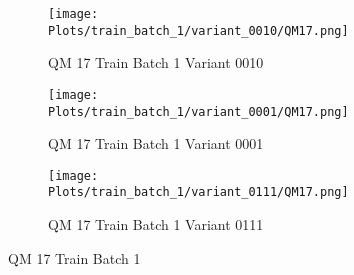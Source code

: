 \documentclass{DissertateFigs}
\begin{document}
\begin{figure}[t!]
\medskip

    \begin{subfigure}{0.43\textwidth}
    \texttt{[image: Plots/train\_batch\_1/variant\_0010/QM17.png]}
    \caption{QM 17 Train Batch 1 Variant 0010}
    \end{subfigure}
    \begin{subfigure}{0.43\textwidth}
    \texttt{[image: Plots/train\_batch\_1/variant\_0001/QM17.png]}
    \caption{QM 17 Train Batch 1 Variant 0001}
    \end{subfigure}

\medskip

    \begin{subfigure}{0.43\textwidth}
    \texttt{[image: Plots/train\_batch\_1/variant\_0111/QM17.png]}
    \caption{QM 17 Train Batch 1 Variant 0111}
    \end{subfigure}
\caption{QM 17 Train Batch 1}
    \end{figure}
\clearpage
\end{document}

